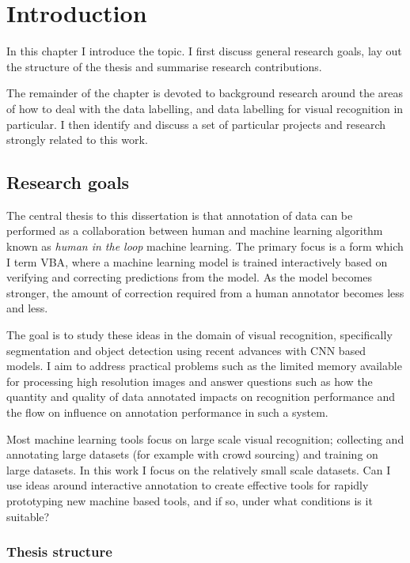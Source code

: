 


\chapter{Introduction}

In this chapter I introduce the topic. I first discuss general research goals, lay out the structure of the thesis and summarise research contributions. 

The remainder of the chapter is devoted to background research around the areas of how to deal with the data labelling, and data labelling for visual recognition in particular. I then identify and discuss a set of particular projects and research strongly related to this work. 


\section{Research goals}
\label{sec:research_goals}

The central thesis to this dissertation is that annotation of data can be performed as a collaboration between human and machine learning algorithm known as \emph{human in the loop} machine learning. The primary focus is a form which I term \gls{VBA}, where a machine learning model is trained interactively based on verifying and correcting predictions from the model. As the model becomes stronger, the amount of correction required from a human annotator becomes less and less.

The goal is to study these ideas in the domain of visual recognition, specifically segmentation and object detection using recent advances with \gls{CNN} based models. I aim to address practical problems such as the limited memory available for processing high resolution images and answer questions such as how the quantity and quality of data annotated impacts on recognition performance and the flow on influence on annotation performance in such a system.

Most machine learning tools focus on large scale visual recognition; collecting and annotating large datasets (for example with crowd sourcing) and training on large datasets. In this work I focus on the relatively small scale datasets. Can I use ideas around interactive annotation to create effective tools for rapidly prototyping new machine based tools, and if so, under what conditions is it suitable?

\subsection {Thesis structure} 

